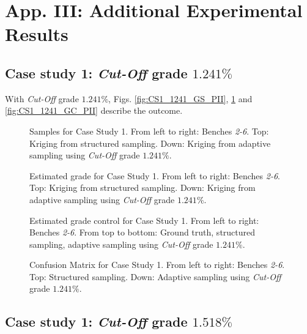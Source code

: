 \clearpage
\newpage
\section{App. III: Additional Experimental Results}

\subsection*{Case study 1: \emph{Cut-Off} grade $1.241\%$}

With \emph{Cut-Off} grade $1.241\%$, Figs. \ref{fig:CS1_1241_GS_PII}, \ref{fig:CS1_1241_EG_PII} and \ref{fig:CS1_1241_GC_PII}  describe the outcome.


\vspace{-0.5cm}
\begin{figure}[h!]
	\centering
	\caption{\label{fig:CS1_1241_GS_PII} Samples for Case Study 1. From left to right: Benches \emph{2-6}. Top: Kriging from structured sampling. Down: Kriging from adaptive sampling using \emph{Cut-Off} grade $1.241\%$.}

	\vspace{.1cm}
	\centering
	\caption{\label{fig:CS1_1241_EG_PII} Estimated grade for Case Study 1. From left to right: Benches \emph{2-6}. Top: Kriging from structured sampling. Down: Kriging from adaptive sampling using \emph{Cut-Off} grade $1.241\%$.}
\end{figure}

\begin{figure}[h!]
	\centering
	\caption{\label{fig:CS1_1241_GC_PII} Estimated grade control for Case Study 1. From left to right: Benches \emph{2-6}. From top to bottom: Ground truth,  structured sampling,  adaptive sampling using \emph{Cut-Off} grade $1.241\%$.}
	\centering
	\caption{\label{fig:CS1_1241_CC_PII} Confusion Matrix for Case Study 1. From left to right: Benches \emph{2-6}. Top: Structured sampling. Down: Adaptive sampling using \emph{Cut-Off} grade $1.241\%$.}
\end{figure}



\clearpage
\subsection*{Case study 1: \emph{Cut-Off} grade $1.518\%$}

